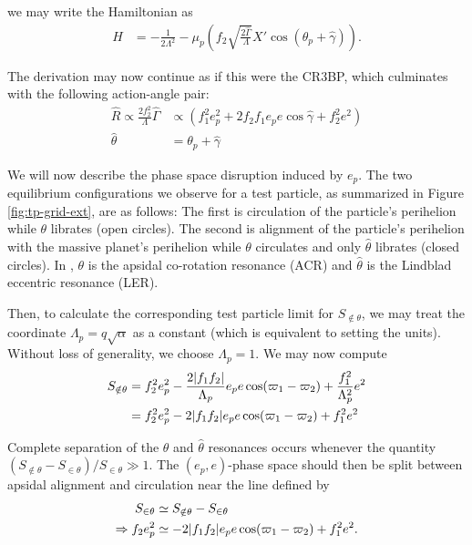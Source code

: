\documentclass[usenatbib,twocolumn]{mnras}
\DeclarePairedDelimiter{\abs}{|}{|}
\begin{document}
\noindent
we may write the Hamiltonian as
\begin{align}
  H
  &= - \frac{1}{2\Lambda^2} - \mu_p\left(f_2
    \sqrt{\frac{2\hat\Gamma}{\Lambda}}X'\cos(\theta_p+\hat\gamma) \right).
\end{align}

\noindent
The derivation may now continue as if this were the CR3BP,
which culminates with the following action-angle pair:
\begin{align}
\hat R \propto
\frac{2f_2^2}{\Lambda}\hat\Gamma
  &\propto(f_1^2 e_p^2 + 2 f_2 f_1 e_pe\cos\hat\gamma + f_2^2 e^2 ) \\
\hat\theta
  &= \theta_p + \hat\gamma
\end{align}





We will now describe the phase
space disruption induced by \(e_p\).
The two equilibrium configurations we observe for a test particle, as
summarized in Figure \ref{fig:tp-grid-ext}, are as follows: The first is
circulation of the particle's perihelion while \(\theta\) librates (open
circles).  The second is alignment of the particle's perihelion with
the massive planet's perihelion while \(\theta\) circulates and only
\(\hat\theta\) librates (closed circles).  In
\citet{moutamid14_coupl_between_corot_lindb_reson}, \(\theta\) is the
apsidal co-rotation resonance (ACR) and \(\hat\theta\) is the Lindblad
eccentric resonance (LER).








Then, to calculate the
corresponding test particle limit for \(S_{\notin\theta}\), we may treat
the coordinate \(\Lambda_p = q\sqrt{\alpha}\) as a constant (which is
equivalent to setting the units). Without loss of generality, we
choose \(\Lambda_p=1\). We may now compute
\begin{align}
  S_{\notin\theta} &= f_2^2e_p^2 -
                     \frac{2\abs{f_1f_2}}{\Lambda_p} e_pe\cos(\varpi_1-\varpi_2) +
                     \frac{f_1^2}{\Lambda_p^2} e^2 \\
                   &=f_2^2e_p^2 -
                     2\abs{f_1f_2} e_pe\cos(\varpi_1-\varpi_2) +
                     f_1^2 e^2
\end{align}

\noindent
Complete separation of the \(\theta\) and
\(\hat\theta\) resonances occurs whenever the quantity
\((S_{\notin\theta}-S_{\in\theta})/S_{\in\theta}\gg 1\).  The
\((e_p,e)\text{-phase}\) space should then be split between apsidal
alignment and circulation near the line defined by
\begin{align}
S_{\in\theta} &\simeq S_{\notin\theta}-S_{\in\theta} \label{eq:linedef}\\
\Rightarrow f_2e_p^2 &\simeq -2\abs{f_1f_2}e_pe\cos(\varpi_1-\varpi_2) + f_1^2e^2 \label{eq:linedefcoord}.
\end{align}
\end{document}
